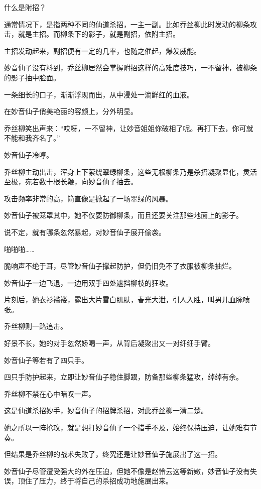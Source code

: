 \begin{this_body}
什么是附招？

通常情况下，是指两种不同的仙道杀招，一主一副。比如乔丝柳此时发动的柳条攻击，就是主招。而柳条下的影子，就是副招，依附主招。

主招发动起来，副招便有一定的几率，也随之催起，爆发威能。

妙音仙子没有料到，乔丝柳居然会掌握附招这样的高难度技巧，一不留神，被柳条的影子抽中脸面。

一条细长的口子，渐渐浮现而出，从中浸处一滴鲜红的血液。

在妙音仙子俏美艳丽的容颜上，分外明显。

乔丝柳笑出声来：“哎呀，一不留神，让妙音姐姐你破相了呢。再打下去，你可就不能和我齐名了。”

妙音仙子冷哼。

乔丝柳主动出击，浑身上下萦绕翠绿柳条，这些无根柳条乃是杀招凝聚显化，灵活至极，宛若数十根长鞭，向妙音仙子抽去。

攻击频率非常的高，简直像是掀起了一场翠绿的风暴。

妙音仙子被笼罩其中，她不仅要防御柳条，而且还要关注那些地面上的影子。

说不定，就有哪条忽然暴起，对妙音仙子展开偷袭。

啪啪啪……

脆响声不绝于耳，尽管妙音仙子撑起防护，但仍旧免不了衣服被柳条抽烂。

妙音仙子一边飞退，一边用双手四处遮挡柳枝的狂攻。

片刻后，她衣衫褴褛，露出大片雪白肌肤，春光大泄，引人入胜，叫男儿血脉喷张。

乔丝柳则一路追击。

好景不长，她的对手忽然娇喝一声，从背后凝聚出又一对纤细手臂。

妙音仙子等若有了四只手。

四只手防护起来，立即让妙音仙子稳住脚跟，防备那些柳条猛攻，绰绰有余。

乔丝柳不禁在心中暗叹一声。

这是仙道杀招妙手，妙音仙子的招牌杀招，对此乔丝柳一清二楚。

她之所以一阵抢攻，就是想打妙音仙子一个措手不及，始终保持压迫，让她难有节奏。

但结果是乔丝柳的战术失败了，终究还是让妙音仙子施展出了这一招。

妙音仙子尽管遭受强大的外在压迫，但她不像是赵怜云这等新嫩，妙音仙子没有失误，顶住了压力，终于将自己的杀招成功地施展出来。


\end{this_body}
